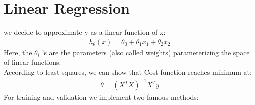 \documentclass{article}
\begin{document}
\section{Linear Regression}
we decide to approximate y as a linear function of x:
\begin{align}
  h_\theta (x) = \theta_0 + \theta_1 x_1 + \theta_2 x_2
\end{align}
Here, the $\theta_i$ ’s are the parameters (also called weights) parameterizing the
space of linear functions.\\
According to least squares, we can show that Cost function reaches minimum at:\\
\begin{align}
  \theta = (X^TX)^{-1}X^Ty
\end{align}
For training and validation we implement two famous methods:\\
\end{document}
